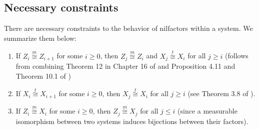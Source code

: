 \documentclass[12pt]{amsart}
\newtheorem{fact}{Fact}
\theoremstyle{definition}
\theoremstyle{plain}
\theoremstyle{definition}
\numberwithin{equation}{section}
\begin{document}





\subsection{Necessary constraints} \label{standard constraints} There are necessary constraints to the behavior of nilfactors within a system. We summarize them below:
  \begin{enumerate}

    \item If $Z_i\overset{m}\cong Z_{i+1}$ for some $i\geq 0$, then $Z_j\overset{m}\cong Z_i$ and $X_j\overset{t}\cong X_i$ for all $j \geq i$ (follows from combining Theorem 12 in Chapter 16 of \cite{HK2} and Proposition 4.11 and Theorem 10.1 of \cite{HK paper})
    
    
     
    \item If $X_i\overset{t}\cong X_{i+1}$ for some $i \geq 0$, then $X_j\overset{t}\cong X_i$ for all $j \geq i$ (see Theorem 3.8 of \cite{Dong}).
    
     \item If $Z_i\overset{m}\cong X_i$ for some $i \geq 0$, then $Z_j\overset{m}\cong X_j$ for all $j \leq i$ (since a measurable isomorphism between two systems induces bijections between their factors).

     
     
\end{enumerate}
\end{document}
